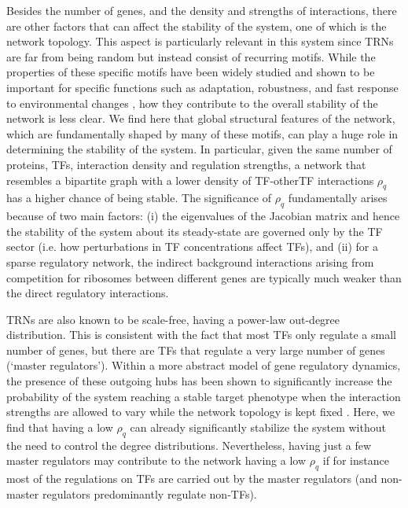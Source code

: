 \documentclass[10pt]{article}
\begin{document}
Besides the number of genes, and the density and strengths of interactions, there are other factors that can affect the stability of the system, one of which is the network topology. This aspect is particularly relevant in this system since TRNs are far from being random but instead consist of recurring motifs. While the properties of these specific motifs have been widely studied and shown to be important for specific functions such as adaptation, robustness, and fast response to environmental changes \cite{alon2019introduction, shen2002network, alon2007network}, how they contribute to the overall stability of the network is less clear. We find here that global structural features of the network, which are fundamentally shaped by many of these motifs, can play a huge role in determining the stability of the system. In particular, given the same number of proteins, TFs, interaction density and regulation strengths, a network that resembles a bipartite graph with a lower density of TF-otherTF interactions $\rho_q$ has a higher chance of being stable. The significance of $\rho_q$ fundamentally arises because of two main factors: (i) the eigenvalues of the Jacobian matrix and hence the stability of the system about its steady-state are governed only by the TF sector (i.e. how perturbations in TF concentrations affect TFs), and (ii) for a sparse regulatory network, the indirect background interactions arising from competition for ribosomes between different genes are typically much weaker than the direct regulatory interactions.

TRNs are also known to be scale-free, having a power-law out-degree distribution. This is consistent with the fact that most TFs only regulate a small number of genes, but there are TFs that regulate a very large number of genes (`master regulators'). Within a more abstract model of gene regulatory dynamics, the presence of these outgoing hubs has been shown to significantly increase the probability of the system reaching a stable target phenotype when the interaction strengths are allowed to vary while the network topology is kept fixed \cite{schreier2017exploratory}. Here, we find that having a low $\rho_q$ can already significantly stabilize the system without the need to control the degree distributions. Nevertheless, having just a few master regulators may contribute to the network having a low $\rho_q$ if for instance most of the regulations on TFs are carried out by the master regulators (and non-master regulators predominantly regulate non-TFs). %
\end{document}
